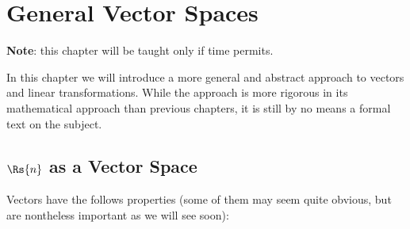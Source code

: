 
\chapter{General Vector Spaces}
\textbf{Note}: this chapter will be taught only if time permits.

In this chapter we will introduce a more general and abstract approach to vectors and linear transformations. While the approach is more rigorous in its mathematical approach than previous chapters, it is still by no means a formal text on the subject.

\section{$\Rs{n}$ as a Vector Space}
Vectors have the follows properties (some of them may seem quite obvious, but are nontheless important as we will see soon):
